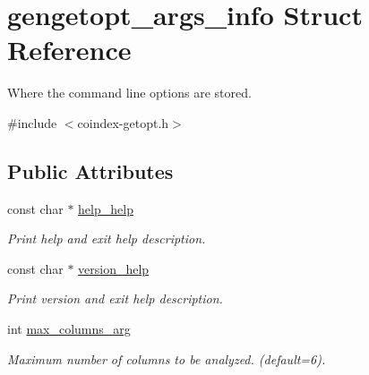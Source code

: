\hypertarget{structgengetopt__args__info}{}\section{gengetopt\+\_\+args\+\_\+info Struct Reference}
\label{structgengetopt__args__info}


Where the command line options are stored.  




{\ttfamily \#include $<$coindex-\/getopt.\+h$>$}

\subsection*{Public Attributes}
\begin{DoxyCompactItemize}
\item 
\mbox{\label{structgengetopt__args__info_a6497d9a5edee41da66eb109f093781a7}} 
const char $\ast$ \hyperlink{structgengetopt__args__info_a6497d9a5edee41da66eb109f093781a7}{help\+\_\+help}
\begin{DoxyCompactList}\small\item\em Print help and exit help description. \end{DoxyCompactList}\item 
\mbox{\label{structgengetopt__args__info_adb4fc9ee66c499d4225d6f6eefbd8c09}} 
const char $\ast$ \hyperlink{structgengetopt__args__info_adb4fc9ee66c499d4225d6f6eefbd8c09}{version\+\_\+help}
\begin{DoxyCompactList}\small\item\em Print version and exit help description. \end{DoxyCompactList}\item 
\mbox{\label{structgengetopt__args__info_a6e3b4e2d6682a674225a4eb2f2536640}} 
int \hyperlink{structgengetopt__args__info_a6e3b4e2d6682a674225a4eb2f2536640}{max\+\_\+columns\+\_\+arg}
\begin{DoxyCompactList}\small\item\em Maximum number of columns to be analyzed. (default=\textquotesingle{}6\textquotesingle{}). \end{DoxyCompactList}\item 
\mbox{\label{structgengetopt__args__info_afd760be7f133c2ed4c49b882a02aaa01}} 

\end{DoxyCompactItemize}
